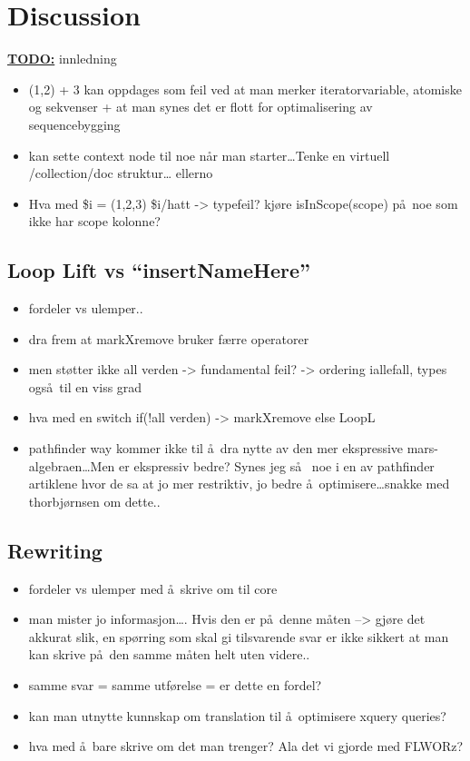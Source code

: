 \chapter{Discussion}
\label{chapter:discussion}

\textbf{\underline{\LARGE TODO:}} innledning

\begin{itemize}
  \item (1,2) + 3 kan oppdages som feil ved at man merker iteratorvariable, atomiske og sekvenser + at man synes
  det er flott for optimalisering av sequencebygging
  \item kan sette context node til noe n\aa r man starter\ldots Tenke en virtuell /collection/doc struktur\ldots
  ellerno
	\item Hva med \$i = (1,2,3) \$i/hatt -> typefeil? kj\o re isInScope(scope) p\aa~noe som ikke har scope kolonne?
\end{itemize}

\section{Loop Lift vs ``insertNameHere''}
\label{sect:discussion:llvsmXr}
\begin{itemize}
  \item fordeler vs ulemper..
  \item dra frem at markXremove bruker f\ae rre operatorer
  \item men st\o tter ikke all verden -> fundamental feil? -> ordering iallefall, types ogs\aa~til en viss grad
  \item hva med en switch if(!all verden) -> markXremove else LoopL
  \item pathfinder way kommer ikke til \aa~dra nytte av den mer ekspressive mars-algebraen\ldots Men er ekspressiv
	  bedre? Synes jeg s\aa~ noe i en av pathfinder artiklene hvor de sa at jo mer restriktiv, jo bedre
	  \aa~optimisere\ldots snakke med thorbj\o rnsen om dette..
\end{itemize}

\section{Rewriting}
\label{sect:discussion:rewriting}
\begin{itemize}
  \item fordeler vs ulemper med \aa~skrive om til core
  \item man mister jo informasjon\ldots. Hvis den er p\aa~denne m\aa ten --> gj\o re det akkurat
	  slik, en sp\o rring som skal gi tilsvarende svar er ikke sikkert at man kan
	  skrive p\aa~den samme m\aa ten helt uten videre..  
  \item samme svar = samme utf\o relse = er dette en fordel?
  \item kan man utnytte kunnskap om translation til \aa~optimisere xquery queries?
  \item hva med \aa~bare skrive om det man trenger? Ala det vi gjorde med FLWORz?
\end{itemize}

